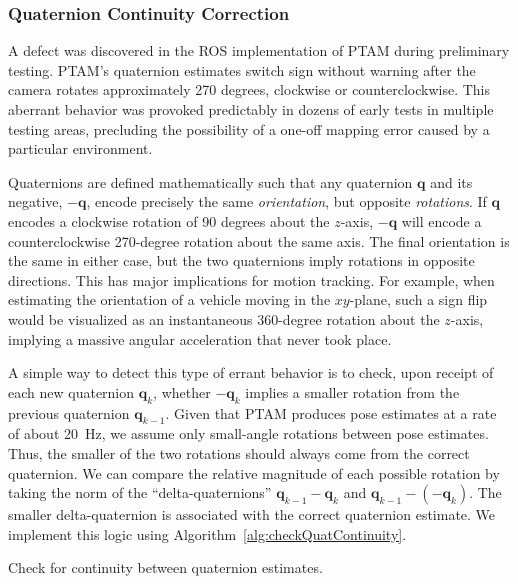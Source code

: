 \subsubsection{Quaternion Continuity Correction}

A defect was discovered in the ROS implementation of PTAM during preliminary testing. PTAM's quaternion estimates switch sign without warning after the camera rotates approximately 270 degrees, clockwise or counterclockwise. This aberrant behavior was provoked predictably in dozens of early tests in multiple testing areas, precluding the possibility of a one-off mapping error caused by a particular environment.

Quaternions are defined mathematically such that any quaternion $\mathbf{q}$ and its negative, $- \mathbf{q}$, encode precisely the same \textit{orientation}, but opposite \textit{rotations}. If $\mathbf{q}$ encodes a clockwise rotation of 90 degrees about the $z$-axis, $- \mathbf{q}$ will encode a counterclockwise 270-degree rotation about the same axis. The final orientation is the same in either case, but the two quaternions imply rotations in opposite directions. This has major implications for motion tracking. For example, when estimating the orientation of a vehicle moving in the $xy$-plane, such a sign flip would be visualized as an instantaneous 360-degree rotation about the $z$-axis, implying a massive angular acceleration that never took place. 

A simple way to detect this type of errant behavior is to check, upon receipt of each new quaternion $\mathbf{q}_{k}$, whether $- \mathbf{q}_{k}$ implies a smaller rotation from the previous quaternion $\mathbf{q}_{k-1}$. Given that PTAM produces pose estimates at a rate of about 20~Hz, we assume only small-angle rotations between pose estimates. Thus, the smaller of the two rotations should always come from the correct quaternion. We can compare the relative magnitude of each possible rotation by taking the norm of the ``delta-quaternions'' $\mathbf{q}_{k-1} - \mathbf{q}_{k}$ and $\mathbf{q}_{k-1} - \left( - \mathbf{q}_{k} \right)$. The smaller delta-quaternion is associated with the correct quaternion estimate. We implement this logic using Algorithm~\ref{alg:checkQuatContinuity}.

\begin{algorithm}
  \caption{Check for continuity between quaternion estimates.}
    \label{alg:checkQuatContinuity}
\end{algorithm}

